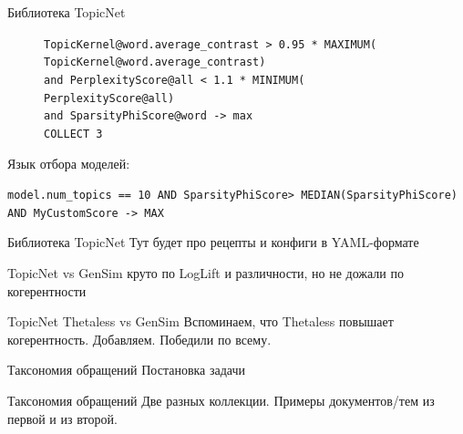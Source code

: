 \begin{frame}{Библиотека TopicNet}

\begin{figure}[ht]
\raggedright
\texttt{TopicKernel@word.average\_contrast > 0.95 * MAXIMUM( \\
\hphantom{\ \ \ \ \ \ \ \ }TopicKernel@word.average\_contrast) \\
\hphantom{\ \ } and PerplexityScore@all < 1.1 * MINIMUM( \\
\hphantom{\ \ \ \ \ \ \ \ }PerplexityScore@all) \\
\hphantom{\ \ } and SparsityPhiScore@word -> max\\
\hphantom{\ \ } COLLECT 3} \\
\label{DSL-example}
\end{figure} 
	Язык отбора моделей:
	

\texttt{model.num\_topics == 10 AND SparsityPhiScore\@word > MEDIAN(SparsityPhiScore\@word) AND MyCustomScore -> MAX}

\end{frame}

\begin{frame}{Библиотека TopicNet}
	Тут будет про рецепты и конфиги в YAML-формате
\end{frame}

\begin{frame}{TopicNet vs GenSim}
	круто по LogLift и различности, но не дожали по когерентности
\end{frame}

\begin{frame}{TopicNet Thetaless vs GenSim}
Вспоминаем, что Thetaless повышает когерентность. Добавляем. Победили по всему.
\end{frame}


\begin{frame}{Таксономия обращений}
	Постановка задачи
\end{frame}

\begin{frame}{Таксономия обращений}
	Две разных коллекции. Примеры документов/тем из первой и из второй.
\end{frame}

